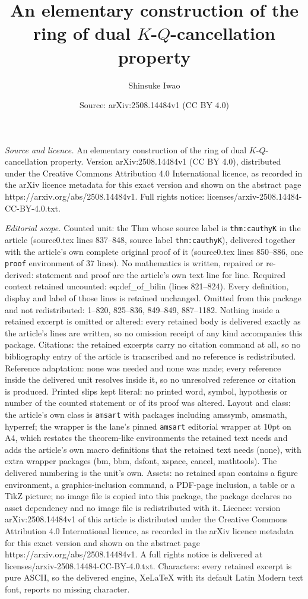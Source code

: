 \documentclass[10pt,a4paper]{amsart}
\title[An elementary construction of the ring of dual $K$-$Q$-cance]{An elementary construction of the ring of dual $K$-$Q$-cancellation property}
\author{Shinsuke Iwao}
\date{Source: arXiv:2508.14484v1 (CC BY 4.0)}
\begin{document}
\maketitle

\noindent\emph{Source and licence.} An elementary construction of the ring of dual $K$-$Q$-cancellation property. Version arXiv:2508.14484v1 (CC BY 4.0), distributed under the Creative Commons Attribution 4.0 International licence, as recorded in the arXiv licence metadata for this exact version and shown on the abstract page https://arxiv.org/abs/2508.14484v1. Full rights notice: licenses/arxiv-2508.14484-CC-BY-4.0.txt.\par\smallskip

\noindent\textit{Editorial scope.} Counted unit: the Thm whose source label is \texttt{thm:cauthyK} in the article (source0.tex lines 837--848, source label \texttt{thm:cauthyK}), delivered together with the article's own complete original proof of it (source0.tex lines 850--886, one \texttt{proof} environment of 37 lines). No mathematics is written, repaired or re-derived: statement and proof are the article's own text line for line. Required context retained uncounted: eq:def\_of\_bilin (lines 821--824). Every definition, display and label of those lines is retained unchanged. Omitted from this package and not redistributed: 1--820, 825--836, 849--849, 887--1182. Nothing inside a retained excerpt is omitted or altered: every retained body is delivered exactly as the article's lines are written, so no omission receipt of any kind accompanies this package. Citations: the retained excerpts carry no citation command at all, so no bibliography entry of the article is transcribed and no reference is redistributed. Reference adaptation: none was needed and none was made; every reference inside the delivered unit resolves inside it, so no unresolved reference or citation is produced. Printed slips kept literal: no printed word, symbol, hypothesis or number of the counted statement or of its proof was altered. Layout and class: the article's own class is \texttt{amsart} with packages including amssymb, amsmath, hyperref; the wrapper is the lane's pinned \texttt{amsart} editorial wrapper at 10pt on A4, which restates the theorem-like environments the retained text needs and adds the article's own macro definitions that the retained text needs (none), with extra wrapper packages (bm, bbm, dsfont, xspace, cancel, mathtools). The delivered numbering is the unit's own. Assets: no retained span contains a figure environment, a graphics-inclusion command, a PDF-page inclusion, a table or a TikZ picture; no image file is copied into this package, the package declares no asset dependency and no image file is redistributed with it. Licence: version arXiv:2508.14484v1 of this article is distributed under the Creative Commons Attribution 4.0 International licence, as recorded in the arXiv licence metadata for this exact version and shown on the abstract page https://arxiv.org/abs/2508.14484v1. A full rights notice is delivered at licenses/arxiv-2508.14484-CC-BY-4.0.txt. Characters: every retained excerpt is pure ASCII, so the delivered engine, XeLaTeX with its default Latin Modern text font, reports no missing character.
\end{document}
